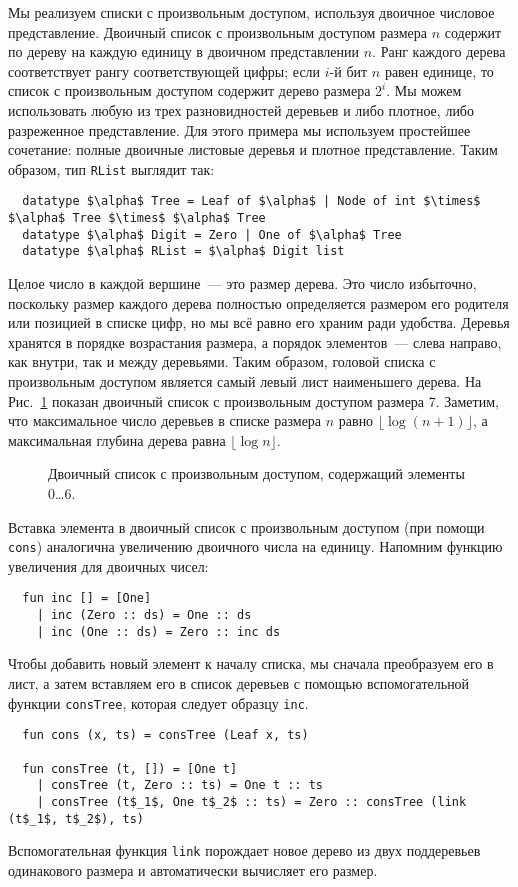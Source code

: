 Мы реализуем списки с произвольным доступом, используя двоичное
числовое представление. Двоичный список с произвольным доступом
размера $n$ содержит по дереву на каждую единицу в двоичном
представлении $n$. Ранг каждого дерева соответствует рангу
соответствующей цифры; если $i$-й бит $n$ равен единице, то список с
произвольным доступом содержит дерево размера $2^i$. Мы можем
использовать любую из трех разновидностей деревьев и либо плотное,
либо разреженное представление. Для этого примера мы используем
простейшее сочетание: полные двоичные листовые деревья и плотное
представление. Таким образом, тип \lstinline!RList! выглядит так:
\begin{lstlisting}
  datatype $\alpha$ Tree = Leaf of $\alpha$ | Node of int $\times$ $\alpha$ Tree $\times$ $\alpha$ Tree
  datatype $\alpha$ Digit = Zero | One of $\alpha$ Tree
  datatype $\alpha$ RList = $\alpha$ Digit list
\end{lstlisting}
Целое число в каждой вершине~--- это размер дерева. Это число
избыточно, поскольку размер каждого дерева полностью определяется
размером его родителя или позицией в списке цифр, но мы всё равно его
храним ради удобства. Деревья хранятся в порядке возрастания размера,
а порядок элементов~--- слева направо, как внутри, так и между
деревьями. Таким образом, головой списка с произвольным доступом
является самый левый лист наименьшего дерева. На Рис.~\ref{fig:9.5}
показан двоичный список с произвольным доступом размера 7. Заметим,
что максимальное число деревьев в списке размера $n$ равно
$\lfloor \log (n+1) \rfloor$, а максимальная глубина дерева равна
$\lfloor \log n \rfloor$.

\begin{figure}
  \centering
  
  \caption{Двоичный список с произвольным доступом, содержащий элементы 0\ldots 6.}
  \label{fig:9.5}
\end{figure}

Вставка элемента в двоичный список с произвольным доступом (при помощи
\lstinline!cons!) аналогична увеличению двоичного числа на
единицу. Напомним функцию увеличения для двоичных чисел:
\begin{lstlisting}
  fun inc [] = [One]
    | inc (Zero :: ds) = One :: ds
    | inc (One :: ds) = Zero :: inc ds
\end{lstlisting}
Чтобы добавить новый элемент к началу списка, мы сначала преобразуем
его в лист, а затем вставляем его в список деревьев с помощью
вспомогательной функции \lstinline!consTree!, которая следует образцу
\lstinline!inc!.
\begin{lstlisting}
  fun cons (x, ts) = consTree (Leaf x, ts)

  fun consTree (t, []) = [One t]
    | consTree (t, Zero :: ts) = One t :: ts
    | consTree (t$_1$, One t$_2$ :: ts) = Zero :: consTree (link (t$_1$, t$_2$), ts)
\end{lstlisting}
Вспомогательная функция \lstinline!link! порождает новое дерево из двух
поддеревьев одинакового размера и автоматически вычисляет его размер.

